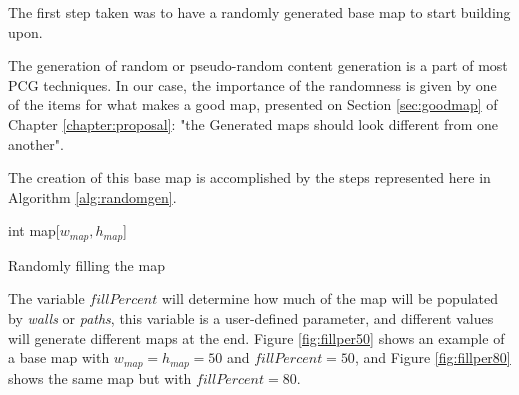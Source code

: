 The first step taken was to have a randomly generated base map to start building upon.

The generation of random or pseudo-random content generation is a part of most PCG techniques. In our case, the importance of the randomness is given by one of the items for what makes a good map, presented on Section \ref{sec:goodmap} of Chapter \ref{chapter:proposal}: "the Generated maps should look different from one another".

The creation of this base map is accomplished by the steps represented here in Algorithm \ref{alg:randomgen}.


\begin{algorithm}[h] 
 \DontPrintSemicolon
 int map[\(w_{map},h_{map}\)]\;
 \caption{Randomly filling the map}\label{alg:randomgen}
\end{algorithm} 

The variable \(fillPercent\) will determine how much of the map will be populated by \emph{walls} or \emph{paths}, this variable is a user-defined parameter, and different values will generate different maps at the end. Figure \ref{fig:fillper50} shows an example of a base map with \(w_{map} = h_{map} = 50\) and  \(fillPercent = 50\), and Figure \ref{fig:fillper80} shows the same map but with \(fillPercent = 80\).

